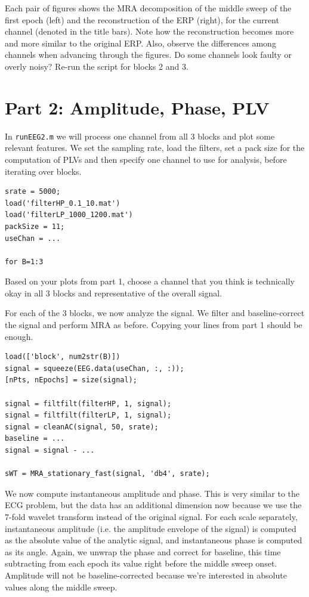 \documentclass[10pt,a4paper,notitlepage]{report}
\begin{document}
Each pair of figures shows the MRA decomposition of the middle sweep of the first epoch (left) and the reconstruction of the ERP (right), for the current channel (denoted in the title bars). Note how the reconstruction becomes more and more similar to the original ERP. Also, observe the differences among channels when advancing through the figures. Do some channels look faulty or overly noisy? Re-run the script for blocks 2 and 3.

\section*{Part 2: Amplitude, Phase, PLV}
In \texttt{runEEG2.m} we will process one channel from all 3 blocks and plot some relevant features. We set the sampling rate, load the filters, set a pack size for the computation of PLVs and then specify one channel to use for analysis, before iterating over blocks.

\begin{verbatim}
srate = 5000;
load('filterHP_0.1_10.mat')
load('filterLP_1000_1200.mat')
packSize = 11;
useChan = ...

for B=1:3
\end{verbatim}

Based on your plots from part 1, choose a channel that you think is technically okay in all 3 blocks and representative of the overall signal.

For each of the 3 blocks, we now analyze the signal. We filter and baseline-correct the signal and perform MRA as before. Copying your lines from part 1 should be enough.

\begin{verbatim}
load(['block', num2str(B)])
signal = squeeze(EEG.data(useChan, :, :));
[nPts, nEpochs] = size(signal);

signal = filtfilt(filterHP, 1, signal);
signal = filtfilt(filterLP, 1, signal);
signal = cleanAC(signal, 50, srate);
baseline = ...
signal = signal - ...

sWT = MRA_stationary_fast(signal, 'db4', srate);
\end{verbatim}

We now compute instantaneous amplitude and phase. This is very similar to the ECG problem, but the data has an additional dimension now because we use the 7-fold wavelet transform instead of the original signal. For each scale separately, instantaneous amplitude (i.e. the amplitude envelope of the signal) is computed as the absolute value of the analytic signal, and instantaneous phase is computed as its angle. Again, we unwrap the phase and correct for baseline, this time subtracting from each epoch its value right before the middle sweep onset. Amplitude will not be baseline-corrected because we're interested in absolute values along the middle sweep.
\end{document}
